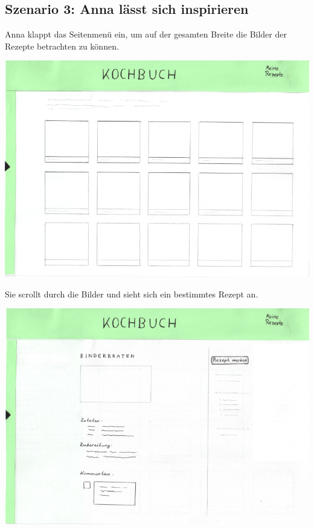 \documentclass[parskip,10pt,abstracton]{scrartcl}
\begin{document}
\subsection*{Szenario 3: Anna lässt sich inspirieren}

Anna klappt das Seitenmenü ein, um auf der gesamten Breite die Bilder der Rezepte betrachten zu können.
\begin{center}
\includegraphics[scale=0.4]{Prototyp/home_menuhidden.png}
\end{center}

Sie scrollt durch die Bilder und sieht sich ein bestimmtes Rezept an.
\begin{center}
\includegraphics[scale=0.4]{Prototyp/rezeptseite_menuhidden.png}
\end{center}
\end{document}

